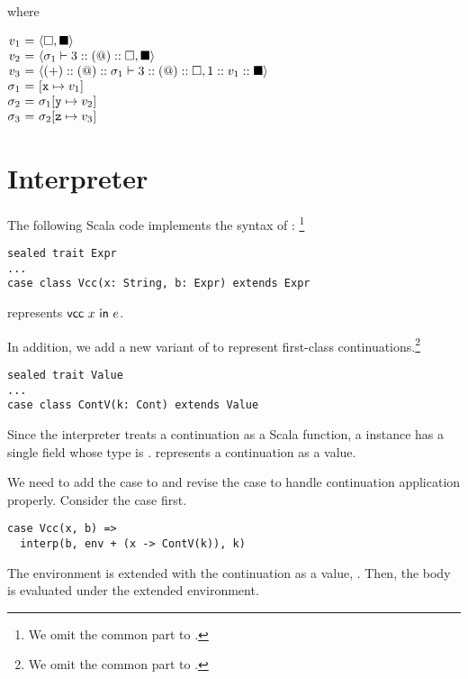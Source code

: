 where

$
\begin{array}{@{}r@{~}c@{~}l}
  v_1&=&\langle\square,\blacksquare\rangle\\
  v_2&=&\langle\sigma_1\vdash3::(@)::\square,\blacksquare\rangle\\
  v_3&=&\langle(+)::(@)::\sigma_1\vdash3::(@)::\square,1::v_1::\blacksquare\rangle\\
  \sigma_1&=&[\cx\mapsto v_1]\\
  \sigma_2&=&\sigma_1[\cy\mapsto v_2]\\
  \sigma_3&=&\sigma_2[\cz\mapsto v_3]\\
\end{array}
$

\section{Interpreter}

The following Scala code implements the syntax of \Lang:
\footnote{We omit the common part to \plang.}

\begin{verbatim}
sealed trait Expr
...
case class Vcc(x: String, b: Expr) extends Expr
\end{verbatim}

 represents $\textsf{vcc}\ x\ \textsf{in}\ e$.

In addition, we add a new variant of  to represent first-class
continuations.\footnote{We omit the common part to \plang.}

\begin{verbatim}
sealed trait Value
...
case class ContV(k: Cont) extends Value
\end{verbatim}

Since the interpreter treats a continuation as a Scala function,
a  instance has a single field whose type is .
 represents a continuation  as a value.

We need to add the  case to  and revise the 
case to handle continuation application properly.
Consider the  case first.

\begin{verbatim}
case Vcc(x, b) =>
  interp(b, env + (x -> ContV(k)), k)
\end{verbatim}

The environment is extended with the continuation as a value,
. Then, the body is evaluated under the extended environment.

